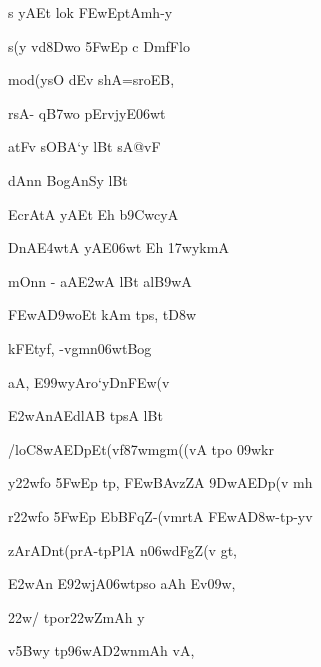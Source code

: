 \dnnemslokab 
{\dn s yAEt lok\2 \3FEwEptAmh-y \dandadn\dontdisplaylinenum}

\dnnemslokac 
{\dn s(y\2 vd\?\38Dwo \35FwEp c Dm\0fFlo}
\dontdisplaylinenum

\dnnemslokad 
{\dn mod(ysO d\?Ev shA=sroEB, \vegdn\dontdisplaylinenum}


\ujvers\dnnemsloka 
{\dn rsA- q\3B7wo pErvj\0yE\306wt}
\dontdisplaylinenum

\dnnemslokab 
{\dn atFv sOBA`y lB\?t sA@vF \dandadn\dontdisplaylinenum}

\dnnemslokac 
{\dn dAn\?n BogAnSy\2 lB\?t}
\dontdisplaylinenum

\dnnemslokad 
{\dn EcrAtA\2 yAEt Eh b\5\39CwcyA\0 \vegdn\dontdisplaylinenum}


\ujvers\dnnemsloka 
{\dn DnA\3E4wtA\2 yAE\306wt Eh \317wykmA\0}
\dontdisplaylinenum

\dnnemslokab 
{\dn mOn\?n {\rs -\re} aA\3E2wA lBt\? al\3B9wA \dandadn\dontdisplaylinenum}

\dnnemslokac 
{\dn \3FEwA\3D9woEt kAm\2 tps, t\3D8w\2}
\dontdisplaylinenum

\dnnemslokad 
{\dn kFEt\0y\0f, -vg\0mn\306wtBog \vegdn\dontdisplaylinenum}


\dnvers

{\dn aA, E\399wyAro`yDn\3FEw(v\2{\dandabdn} \dontdisplaylinenum}

{\dn \3E2wAnAEdlAB\2 tpsA lB\?t \vegdn\dontdisplaylinenum}

\nemsloka

\ujvers\dnnemsloka 
{\dn /\4lo\3C8wAEDpEt(vf\387wmgm((vA tpo \309wkr}
\dontdisplaylinenum

\dnnemslokab 
{\dn y\322w\?fo \35FwEp tp, \3FEwBAvzZA \39DwAEDp(v\2 mh \dandadn\dontdisplaylinenum}

\dnnemslokac 
{\dn r\322w\?fo \35FwEp EbBFqZ-(vmrtA\2 \3FEwA\3D8w-tp-y\4v }
\dontdisplaylinenum

\dnnemslokad 
{\dn zArADnt(prA-tpPlA n\306wdFgZ(v\2 gt, \vegdn\dontdisplaylinenum}


\ujvers\dnnemsloka 
{\dn \3E2wAn\2 E\392wjA\306wtpso aAh Ev\309w,}
\dontdisplaylinenum

\dnnemslokab 
{\dn \322w/\2 tpor\322wZmAh y\0 \dandadn\dontdisplaylinenum}

\dnnemslokac 
{\dn v\4\35Bwy\2 tp\396wA\3D2wnmAh vA,}
\dontdisplaylinenum

